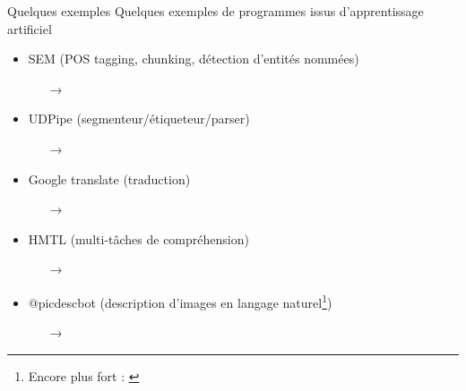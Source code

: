 \documentclass[../allslides.tex]{subfiles}
\begin{document}
\begin{frame}{Quelques exemples}
	Quelques exemples de programmes issus d'apprentissage artificiel
	\begin{itemize}
		\item SEM (POS tagging, chunking, détection d'entités nommées)
			\begin{itemize}
				\item[→] 
			\end{itemize}
		\item UDPipe (segmenteur/étiqueteur/parser)
			\begin{itemize}
				\item[→] 
			\end{itemize}
		\item Google translate (traduction)
			\begin{itemize}
				\item[→] 
			\end{itemize}
		\item HMTL (multi-tâches de compréhension)
			\begin{itemize}
				\item[→] 
			\end{itemize}
		\item @picdescbot (description d'images en langage naturel\footnote{Encore plus fort :  \parencite{alishahi2017EncodingPhonologyRecurrent}})
			\begin{itemize}
				\item[→] 
			\end{itemize}
	\end{itemize}
\end{frame}

\end{document}
